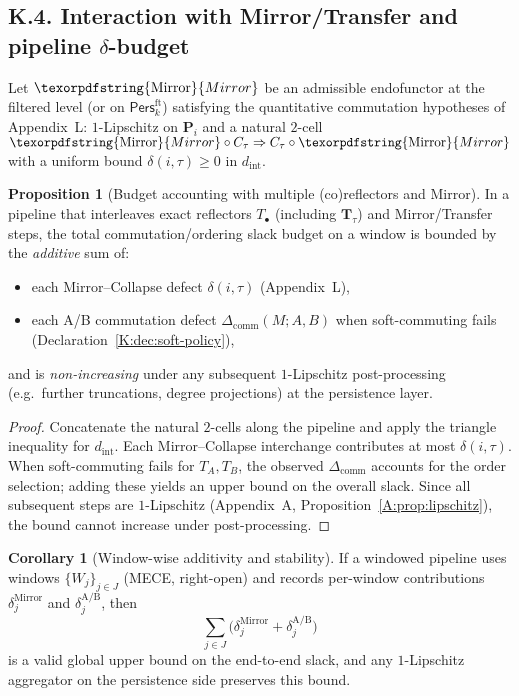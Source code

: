 \documentclass[11pt]{article}
\numberwithin{equation}{section}
\theoremstyle{plain}
\theoremstyle{definition}
\theoremstyle{remark}
\DeclareRobustCommand{\hyp}{\nobreakdash-}
\newcommand{\Pers}{\mathsf{Pers}}
\theoremstyle{plain}
\theoremstyle{definition}
\numberwithin{equation}{section}
\newtheorem{proposition}[theorem]{Proposition}
\newtheorem{corollary}[theorem]{Corollary}
\theoremstyle{definition}
\DeclareRobustCommand{\Mirror}{\texorpdfstring{\ensuremath{\operatorname{Mirror}}}{Mirror}}
\numberwithin{equation}{section}
\theoremstyle{plain}
\theoremstyle{definition}
\theoremstyle{remark}
\begin{document}
\subsection*{K.4. Interaction with Mirror/Transfer and pipeline \(\delta\)\hyp budget}
Let \(\Mirror\) be an admissible endofunctor at the filtered level (or on \(\Pers^{\mathrm{ft}}_k\)) satisfying the quantitative commutation hypotheses of Appendix~L: \(1\)\hyp Lipschitz on \(\mathbf{P}_i\) and a natural \(2\)\hyp cell \(\Mirror\circ C_\tau \Rightarrow C_\tau\circ \Mirror\) with a uniform bound \(\delta(i,\tau)\ge 0\) in \(d_{\mathrm{int}}\).

\begin{proposition}[Budget accounting with multiple (co)reflectors and Mirror]\label{K:prop:budget}
In a pipeline that interleaves exact reflectors \(T_\bullet\) (including \(\mathbf{T}_\tau\)) and Mirror/Transfer steps, the total commutation/ordering slack budget on a window is bounded by the \emph{additive} sum of:
\begin{itemize}\itemsep0.2em
  \item each Mirror–Collapse defect \(\delta(i,\tau)\) (Appendix~L),
  \item each A/B commutation defect \(\Delta_{\mathrm{comm}}(M;A,B)\) when soft\hyp commuting fails (Declaration~\ref{K:dec:soft-policy}),
\end{itemize}
and is \emph{non\hyp increasing} under any subsequent \(1\)\hyp Lipschitz post\hyp processing (e.g.\ further truncations, degree projections) at the persistence layer.
\end{proposition}

\begin{proof}
Concatenate the natural \(2\)\hyp cells along the pipeline and apply the triangle inequality for \(d_{\mathrm{int}}\). Each Mirror–Collapse interchange contributes at most \(\delta(i,\tau)\). When soft\hyp commuting fails for \(T_A,T_B\), the observed \(\Delta_{\mathrm{comm}}\) accounts for the order selection; adding these yields an upper bound on the overall slack. Since all subsequent steps are \(1\)\hyp Lipschitz (Appendix~A, Proposition~\ref{A:prop:lipschitz}), the bound cannot increase under post\hyp processing.
\end{proof}

\begin{corollary}[Window\hyp wise additivity and stability]\label{K:cor:window}
If a windowed pipeline uses windows \(\{W_j\}_{j\in J}\) (MECE, right\hyp open) and records per\hyp window contributions \(\delta_j^{\mathrm{Mirror}}\) and \(\delta_j^{\mathrm{A/B}}\), then
\[
\textstyle \sum_{j\in J}\Big(\delta_j^{\mathrm{Mirror}}+\delta_j^{\mathrm{A/B}}\Big)
\]
is a valid global upper bound on the end\hyp to\hyp end slack, and any \(1\)\hyp Lipschitz aggregator on the persistence side preserves this bound.
\end{corollary}
\end{document}
